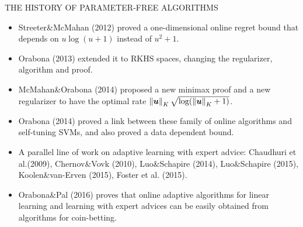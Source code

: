 \documentclass[final,t,serif,mathserif]{beamer}
\def\spazioo{\vspace{-0.3cm}}
\begin{document}
\begin{frame}{}
\begin{columns}[t]
\begin{column}{.33\linewidth}
    
    \begin{block}{THE HISTORY OF PARAMETER-FREE ALGORITHMS}
    \spazioo
    \begin{itemize}
    \item Streeter\&McMahan (2012) proved a one-dimensional online regret bound that depends on $u \log(u+1)$ instead of $u^2+1$.
    \item Orabona (2013) extended it to RKHS spaces, changing the regularizer, algorithm and proof.
    \item McMahan\&Orabona (2014) proposed a new minimax proof and a new regularizer to have the optimal rate $\left\|{\boldsymbol{u}}\right\|_K \sqrt{\log(\left\|{\boldsymbol{u}}\right\|_K+1)}$.
    \item Orabona (2014) proved a link between these family of online algorithms and self-tuning SVMs, and also proved a
    data dependent bound.
    \item A parallel line of work on adaptive learning with expert advice: Chaudhuri et al.(2009), Chernov\&Vovk (2010), Luo\&Schapire (2014), Luo\&Schapire (2015), Koolen\&van-Erven (2015), Foster et al. (2015).
    \item Orabona\&Pal (2016) proves that online adaptive algorithms for linear learning and learning with expert advices can be easily obtained from algorithms for coin-betting.
    \end{itemize}
    \spazioo
    
   

    \end{block}
 

\end{column}
\end{columns}
\end{frame}
\end{document}

